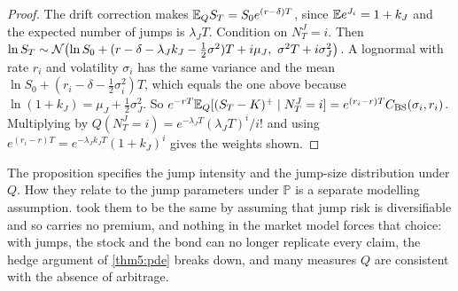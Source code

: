 \begin{chapterrefs}
\begin{proof}
The drift correction makes $\mathbb{E}_QS_T=S_0e^{(r-\delta)T}$, since $\mathbb{E} e^{J_i}=1+k_J$ and the expected number of
jumps is $\lambda_JT$. Condition on $N^J_T=i$. Then
$\ln S_T\sim\N\bigl(\ln S_0+(r-\delta-\lambda_Jk_J-\tfrac12\sigma^2)T+i\mu_J,\ \sigma^2T+i\sigma_J^2\bigr)$. A
lognormal with rate $r_i$ and volatility $\sigma_i$ has the same variance and the mean
$\ln S_0+(r_i-\delta-\tfrac12\sigma_i^2)T$, which equals the one above because $\ln(1+k_J)=\mu_J+\tfrac12\sigma_J^2$.
So $e^{-rT}\mathbb{E}_Q[(S_T-K)^+\mid N^J_T=i]=e^{(r_i-r)T}C_{\mathrm{BS}}(\sigma_i,r_i)$. Multiplying by
$Q(N^J_T=i)=e^{-\lambda_JT}(\lambda_JT)^i/i!$ and using $e^{(r_i-r)T}=e^{-\lambda_Jk_JT}(1+k_J)^i$ gives the
weights shown.
\end{proof}

The proposition specifies the jump intensity and the jump-size distribution under $Q$. How they relate
to the jump parameters under $\mathbb P$ is a separate modelling assumption. \textcite{merton1976} took them
to be the same by assuming that jump risk is diversifiable and so carries no premium, and nothing in
the market model forces that choice: with jumps, the stock and the bond can no longer replicate every
claim, the hedge argument of \cref{thm5:pde} breaks down, and many measures $Q$ are consistent with
the absence of arbitrage.


\end{chapterrefs}
